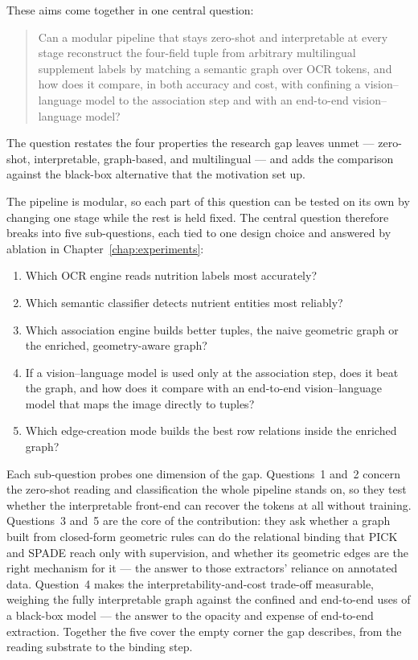 These aims come together in one central question:
\begin{quote}
Can a modular pipeline that stays zero-shot and interpretable at every stage
reconstruct the four-field tuple from arbitrary multilingual supplement labels by
matching a semantic graph over OCR tokens, and how does it compare, in both
accuracy and cost, with confining a vision--language model to the association step
and with an end-to-end vision--language model?
\end{quote}
The question restates the four properties the research gap leaves unmet ---
zero-shot, interpretable, graph-based, and multilingual --- and adds the
comparison against the black-box alternative that the motivation set up.

The pipeline is modular, so each part of this question can be tested on its own by
changing one stage while the rest is held fixed. The central question therefore
breaks into five sub-questions, each tied to one design choice and answered by
ablation in Chapter~\ref{chap:experiments}:
\begin{enumerate}
  \item Which OCR engine reads nutrition labels most accurately?
  \item Which semantic classifier detects nutrient entities most reliably?
  \item Which association engine builds better tuples, the naive geometric graph
        or the enriched, geometry-aware graph?
  \item If a vision--language model is used only at the association step, does it
        beat the graph, and how does it compare with an end-to-end
        vision--language model that maps the image directly to tuples?
  \item Which edge-creation mode builds the best row relations inside the enriched
        graph?
\end{enumerate}

Each sub-question probes one dimension of the gap. Questions~1 and~2 concern the
zero-shot reading and classification the whole pipeline stands on, so they test
whether the interpretable front-end can recover the tokens at all without
training. Questions~3 and~5 are the core of the contribution: they ask whether a
graph built from closed-form geometric rules can do the relational binding that
PICK and SPADE reach only with supervision, and whether its geometric edges are
the right mechanism for it --- the answer to those extractors' reliance on
annotated data. Question~4 makes the interpretability-and-cost trade-off
measurable, weighing the fully interpretable graph against the confined and
end-to-end uses of a black-box model --- the answer to the opacity and expense of
end-to-end extraction. Together the five cover the empty corner the gap describes,
from the reading substrate to the binding step.

